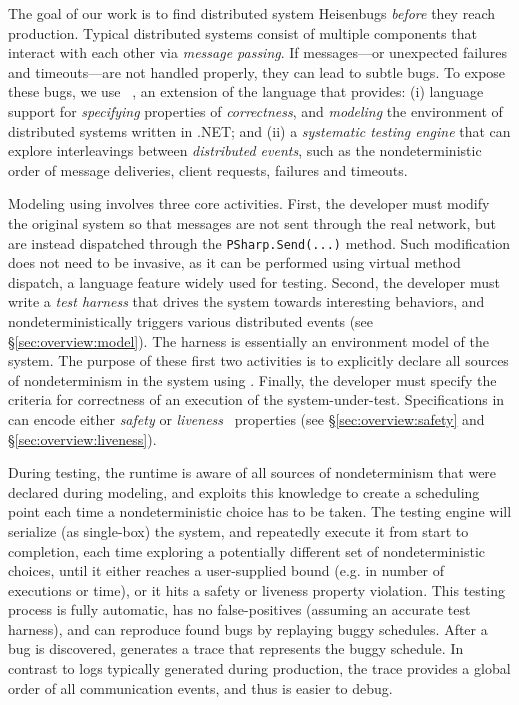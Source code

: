 The goal of our work is to find distributed system Heisenbugs \emph{before} they reach production. Typical distributed systems consist of multiple components that interact with each other via \emph{message passing}. If messages---or unexpected failures and timeouts---are not handled properly, they can lead to subtle bugs. To expose these bugs, we use \psharp~\cite{deligiannis2015psharp}, an extension of the \csharp language that provides: (i) language support for \emph{specifying} properties of \emph{correctness}, and \emph{modeling} the environment of distributed systems written in .NET; and (ii) a \emph{systematic testing engine} that can explore interleavings between \emph{distributed events}, such as the nondeterministic order of message deliveries, client requests, failures and timeouts.

Modeling using \psharp involves three core activities. First, the developer must modify the original system so that messages are not sent through the real network, but are instead dispatched through the \texttt{PSharp.Send(...)} method. Such modification does not need to be invasive, as it can be performed using virtual method dispatch, a \csharp language feature widely used for testing. Second, the developer must write a \psharp \emph{test harness} that drives the system towards interesting behaviors, and nondeterministically triggers various distributed events (see \S\ref{sec:overview:model}). The harness is essentially an environment model of the system. The purpose of these first two activities is to explicitly declare all sources of nondeterminism in the system using \psharp. Finally, the developer must specify the criteria for correctness of an execution of the system-under-test. Specifications in \psharp can encode either \emph{safety} or \emph{liveness}~\cite{lamport1977proving} properties (see \S\ref{sec:overview:safety} and \S\ref{sec:overview:liveness}).

During testing, the \psharp runtime is aware of all sources of nondeterminism that were declared during modeling, and exploits this knowledge to create a scheduling point each time a nondeterministic choice has to be taken. The \psharp testing engine will serialize (as single-box) the system, and repeatedly execute it from start to completion, each time exploring a potentially different set of nondeterministic choices, until it either reaches a user-supplied bound (e.g. in number of executions or time), or it hits a safety or liveness property violation. This testing process is fully automatic, has no false-positives (assuming an accurate test harness), and can reproduce found bugs by replaying buggy schedules. After a bug is discovered, \psharp generates a trace that represents the buggy schedule. In contrast to logs typically generated during production, the \psharp trace provides a global order of all communication events, and thus is easier to debug.

